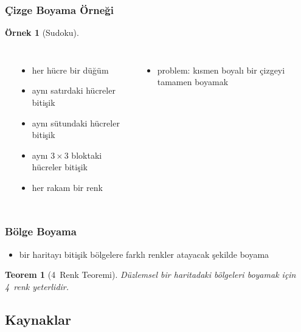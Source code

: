 \documentclass[dvipsnames]{beamer}
\theoremstyle{definition}
\theoremstyle{example}
\newtheorem{ornek}[theorem]{Örnek}
\theoremstyle{plain}
\newtheorem{teorem}[theorem]{Teorem}
\begin{document}
\begin{frame}
  \frametitle{Çizge Boyama Örneği}

  \begin{ornek}[Sudoku]
    \begin{columns}[t]
      \begin{center}
      \end{center}

      \begin{itemize}
        \item her hücre bir düğüm
        \item aynı satırdaki hücreler bitişik
        \item aynı sütundaki hücreler bitişik
        \item aynı $3 \times 3$ bloktaki hücreler bitişik
        \item her rakam bir renk
      \end{itemize}

      \pause
      \begin{itemize}
        \item problem: kısmen boyalı bir çizgeyi tamamen boyamak
      \end{itemize}
    \end{columns}
  \end{ornek}
\end{frame}

\begin{frame}
  \frametitle{Bölge Boyama}

  \begin{itemize}
    \item bir haritayı bitişik bölgelere farklı renkler atayacak şekilde boyama
  \end{itemize}

  \pause
  \medskip
  \begin{teorem}[4~Renk Teoremi]
    Düzlemsel bir haritadaki bölgeleri boyamak için 4~renk yeterlidir.
  \end{teorem}
\end{frame}

\subsection*{Kaynaklar}
\end{document}
